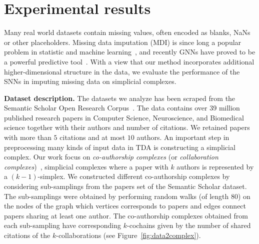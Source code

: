 \section{Experimental results}
Many real world datasets contain missing values, often encoded as blanks, NaNs or other placeholders. Missing data imputation (MDI) is since long a popular problem in statistic and machine learning~\cite{little1986statistical, nelwamondo2007missing}, and recently GNNs have proved to be a powerful predictive tool~\cite{spinelli2020neural}. With a view that our method incorporates additional higher-dimensional structure in the data, we evaluate the performance of the SNNs in imputing missing data on simplicial complexes.

\textbf{Dataset description.} The datasets we analyze has been scraped from the Semantic Scholar Open Research Corpus~\cite{ammar18NAACL}. The data contains over 39 million published research papers in Computer Science, Neuroscience, and Biomedical science together with their authors and number of citations. We retained papers with more than $5$ citations and at most $10$ authors. An important step in preprocessing many kinds of input data in TDA is constructing a simplicial complex. Our work focus on \emph{co-authorship complexes} (or \emph{collaboration complexes})~\cite{patania2017}, simplicial complexes where a paper with $k$ authors is represented by a $(k-1)$-simplex. We constructed different co-authorship complexes by considering sub-samplings from the papers set of the Semantic Scholar dataset. The sub-samplings were obtained by performing random walks (of length $80$) on the nodes of the graph which vertices corresponds to papers and edges connect papers sharing at least one author. The co-authorship complexes obtained from each sub-sampling have corresponding $k$-cochains given by the number of shared citations of the $k$-collaborations (see Figure~\ref{fig:data2complex}).

